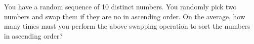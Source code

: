   You have a random sequence of 10 distinct numbers.
  You randomly pick two numbers and swap them if they are no in ascending
  order.
  On the average, how many times must you perform the above swapping
  operation to sort the numbers in ascending order?
